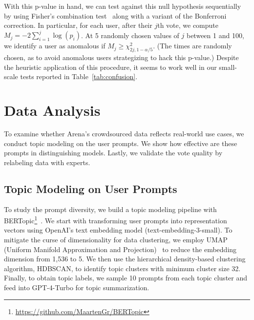 \documentclass{article}
\newcommand{\showcomments}{yes}
\newcommand\todo[1]{\ifthenelse{\equal{\showcomments}{yes}}{{\color{red} TODO: #1}}{\ignorespaces}}
\begin{document}
With this p-value in hand, we can test against this null hypothesis sequentially by using Fisher's combination test~\cite{fisher1928statistical} along with a variant of the Bonferroni correction.
In particular, for each user, after their $j$th vote, we compute $M_j = -2\sum\limits_{i=1}^j\log(p_i)$.
At 5 randomly chosen values of $j$ between 1 and 100, we identify a user as anomalous if $M_j \geq \chi^2_{2j, 1-\alpha/5}$. 
(The times are randomly chosen, as to avoid anomalous users strategizing to hack this p-value.)
Despite the heuristic application of this procedure, it seems to work well in our small-scale tests reported in Table~\ref{tab:confusion}.

\section{Data Analysis}



To examine whether Arena's crowdsourced data reflects real-world use cases, we conduct topic modeling on the user prompts.
We show how effective are these prompts in distinguishing models. Lastly, we validate the vote quality by relabeling data with experts.

\subsection{Topic Modeling on User Prompts}

To study the prompt diversity, we build a topic modeling pipeline with BERTopic\footnote{\url{https://github.com/MaartenGr/BERTopic}}~\cite{grootendorst2022bertopic}.
We start with transforming user prompts into representation vectors using OpenAI's text embedding model (text-embedding-3-small).
To mitigate the curse of dimensionality for data clustering, we employ UMAP (Uniform Manifold Approximation and Projection)~\citep{mcinnes2020umap} to reduce the embedding dimension from 1,536 to 5.
We then use the hierarchical density-based clustering algorithm, HDBSCAN, to identify topic clusters with minimum cluster size 32.
Finally, to obtain topic labels, we sample 10 prompts from each topic cluster and feed into GPT-4-Turbo for topic summarization.
\end{document}
